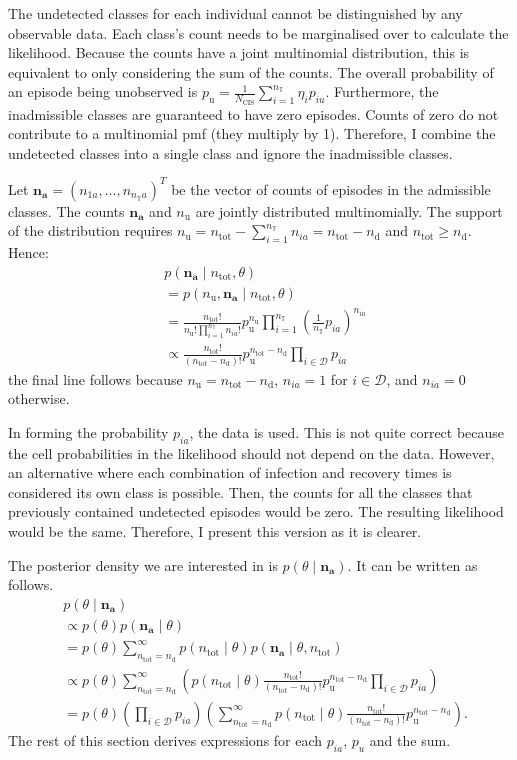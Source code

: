 \documentclass[12pt, letterpaper]{article} %
\newcommand\set{\mathcal}
\renewcommand{\vec}{\bm}
\newcommand{\ntot}{n_\text{tot}}
\newcommand{\ndet}{n_\text{d}}
\newcommand{\nnodet}{n_\text{u}}
\newcommand{\pnodet}{p_\text{u}}
\newcommand{\Ncis}{N_\text{CIS}}
\newcommand{\na}{\vec{n_\text{a}}}
\newcommand{\sched}{\mathbb{T}}
\newcommand{\nsched}{n_{\sched}}
\begin{document}
The undetected classes for each individual cannot be distinguished by any observable data.
Each class's count needs to be marginalised over to calculate the likelihood.
Because the counts have a joint multinomial distribution, this is equivalent to only considering the sum of the counts.
The overall probability of an episode being unobserved is $\pnodet = \frac{1}{\Ncis} \sum_{i=1}^{\nsched} \eta_i p_{iu}$.
Furthermore, the inadmissible classes are guaranteed to have zero episodes.
Counts of zero do not contribute to a multinomial pmf (they multiply by 1).
Therefore, I combine the undetected classes into a single class and ignore the inadmissible classes.

Let $\na = (n_{1a}, \dots, n_{\nsched a})^T$ be the vector of counts of episodes in the admissible classes.
The counts $\na$ and $\nnodet$ are jointly distributed multinomially.
The support of the distribution requires $\nnodet = \ntot - \sum_{i=1}^{\nsched} n_{ia} = \ntot - \ndet$ and $\ntot \geq \ndet$.
Hence:
\begin{align}
&p(\na \mid \ntot, \theta) \\
&= p(\nnodet, \na\mid \ntot, \theta) \\
&= \frac{\ntot!}{\nnodet! \prod_{i=1}^{\nsched} n_{ia}!}  \pnodet^{\nnodet}\prod_{i=1}^{\nsched} \left(\frac{1}{\nsched}p_{ia}\right)^{n_{ia}} \\
&\propto \frac{\ntot!}{(\ntot - \ndet)!} \pnodet^{\ntot - \ndet} \prod_{i \in \set{D}} p_{ia} \label{perf-test:eq:augmented-likelihood}
\end{align}
the final line follows because $\nnodet = \ntot - \ndet$, $n_{ia} = 1$ for $i \in \set{D}$, and $n_{ia} = 0$ otherwise.

In forming the probability $p_{ia}$, the data is used.
This is not quite correct because the cell probabilities in the likelihood should not depend on the data.
However, an alternative where each combination of infection and recovery times is considered its own class is possible.
Then, the counts for all the classes that previously contained undetected episodes would be zero.
The resulting likelihood would be the same.
Therefore, I present this version as it is clearer.

The posterior density we are interested in is $p(\theta \mid \na)$.
It can be written as follows.
\begin{align}
&p(\theta \mid \na) \\
&\propto p(\theta) p(\na \mid \theta) \\
&= p(\theta) \sum_{\ntot=\ndet}^\infty p(\ntot \mid \theta) p(\na \mid \theta, \ntot) \\
&\propto p(\theta) \sum_{\ntot=\ndet}^\infty \left( p(\ntot \mid \theta) \frac{\ntot!}{(\ntot - \ndet)!} \pnodet^{\ntot - \ndet} \prod_{i \in \set{D}} p_{ia} \right) \\
&= p(\theta) \left( \prod_{i \in \set{D}} p_{ia} \right) \left( \sum_{\ntot=\ndet}^\infty p(\ntot \mid \theta) \frac{\ntot!}{(\ntot - \ndet)!} \pnodet^{\ntot - \ndet} \right) \label{perf-test:eq:full-posterior}.
\end{align}
The rest of this section derives expressions for each $p_{ia}$, $p_{u}$ and the sum.
\end{document}
